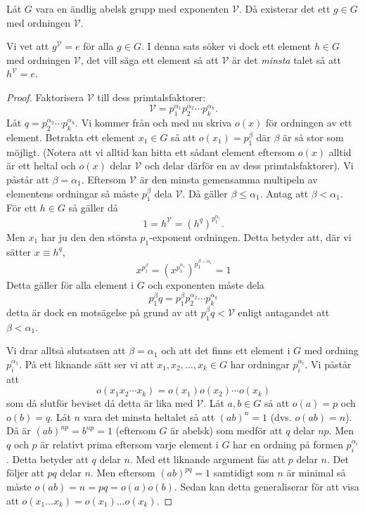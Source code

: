 \documentclass{article}
\theoremstyle{definition}
\begin{document}
\hypertarget{lemma8.0.2}{}
\begin{mylemma}{}{}
  Låt $G$ vara en ändlig abelsk grupp med exponenten $\mathcal{V}$. Då existerar det ett $g \in G$ med ordningen $\mathcal{V}$. 
\end{mylemma}
Vi vet att $g^\mathcal{V} = e$ för alla $g \in G$. I denna sats söker vi dock ett element $h \in G$ med ordningen $\mathcal{V}$, det vill säga 
ett element så att $\mathcal{V}$ är det \textit{minsta} talet så att $h^\mathcal{V} = e$.
\begin{proof}
  Faktorisera $\mathcal{V}$ till dess primtalsfaktorer: 
  \[\mathcal{V} = p_1^{\alpha_1}p_2^{\alpha_2} \cdots p_k^{\alpha_k}.\]
  Låt $q = p_2^{\alpha_2} \cdots p_k^{\alpha_k}$.
  Vi kommer från och med nu skriva $o(x)$ för ordningen av ett element. Betrakta ett element $x_1 \in G$ så att $o(x_1) = p_1^\beta$ där $\beta$ 
  är så stor som möjligt.
  (Notera att vi alltid kan hitta ett sådant element eftersom $o(x)$ alltid är ett heltal och $o(x)$ delar $\mathcal{V}$ och delar därför en 
  av dess primtalsfaktorer).
  Vi påstår att $\beta = \alpha_1$. Eftersom $\mathcal{V}$ är den minsta gemensamma multipeln av elementens ordningar 
  så måste $p_1^\beta$ dela $\mathcal{V}$. Då gäller $\beta \leq \alpha_1$. Antag att $\beta < \alpha_1$. För ett $h \in G$ så gäller då 
  \[1 = h^\mathcal{V} = (h^q)^{p_1^{\alpha_1}}.\]
  Men $x_1$ har ju den den största $p_1$-exponent ordningen. Detta betyder att, där vi sätter $x \equiv h^q$,
  \[x^{p_1^\beta} = (x^{p_1^{\alpha_1}})^{p_1^{\beta - \alpha_1}} = 1\]
  Detta gäller för alla element i $G$ och exponenten måste dela
  \[p_1^{\beta}q = p_1^{\beta} p_2^{\alpha_2} \cdots p_k^{\alpha_k}\]
  detta är dock en motsägelse på grund av att $p_1^{\beta}q < \mathcal{V}$ enligt antagandet att $\beta < \alpha_1$.

  Vi drar alltså slutsatsen att $\beta = \alpha_1$ och att det finns ett element i $G$ med ordning $p_i^{\alpha_1}$. På ett liknande sätt 
  ser vi att $x_1, x_2, \ldots, x_k \in G$ har ordningar $p_i^{\alpha_i}$. Vi påstår att 
  \[o(x_1x_2 \cdots x_k) = o(x_1)o(x_2) \cdots o(x_k)\]
  som då slutför beviset då detta är lika med $\mathcal{V}$. Låt $a, b \in G$ så att $o(a) = p$ och $o(b) = q$. 
  Låt $n$ vara det minsta heltalet så att $(a b)^n = 1$ (dvs. $o(ab) = n$).
  Då är $(ab)^{np} = b^{np} = 1$ (eftersom $G$ är abelsk) som medför att $q$ delar $np$. Men $q$ och $p$ är relativt prima eftersom 
  varje element i $G$ har en ordning på formen $p_i^{\alpha_i}$. Detta betyder att $q$ delar $n$. Med ett liknande argument fås att $p$ delar $n$. 
  Det följer att $pq$ delar $n$. Men eftersom $(ab)^{pq} = 1$ samtidigt som $n$ är minimal så måste $o(ab) = n = pq = o(a)o(b)$. Sedan kan 
  detta generaliserar för att visa att $o(x_1 \ldots x_k) = o(x_1) \ldots o(x_k)$.
\end{proof}
\end{document}
